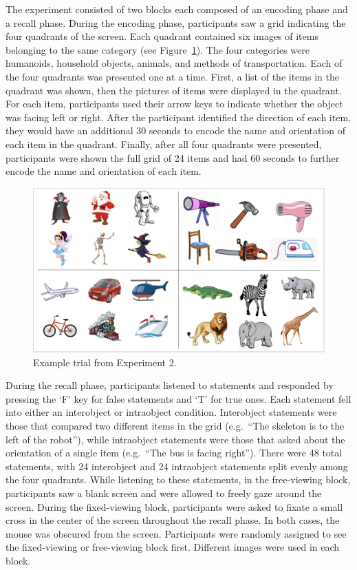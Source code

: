 \documentclass[
  man,floatsintext]{apa6}
\begin{document}
The experiment consisted of two blocks each composed of an encoding
phase and a recall phase. During the encoding phase, participants saw a
grid indicating the four quadrants of the screen. Each quadrant
contained six images of items belonging to the same category (see Figure~\ref{fig:E2-example-trial}).
The four categories were humanoids, household objects, animals, and
methods of transportation.
Each of the four quadrants was presented one at a time. First, a list of
the items in the quadrant was shown, then the pictures of items were displayed in the quadrant.
For each item, participants used their arrow keys to indicate whether the object was facing left or right. After the participant identified the direction of each
item, they would have an additional 30 seconds to encode the name and
orientation of each item in the quadrant. Finally, after all four quadrants
were presented, participants were shown the full grid of
24 items and had 60 seconds to further encode the name and orientation
of each item.

\begin{figure}
\includegraphics[width=5.47in]{group-b/E2-example-figure} \caption{Example trial from Experiment 2.}\label{fig:E2-example-trial}
\end{figure}

During the recall phase, participants listened to statements and
responded by pressing the `F' key for false statements and `T' for true
ones. Each statement fell into either an interobject or intraobject
condition. Interobject statements were those that compared two different
items in the grid (e.g.~``The skeleton is to the left of the robot''),
while intraobject statements were those that asked about the orientation
of a single item (e.g.~``The bus is facing right''). There were 48 total
statements, with 24 interobject and 24 intraobject statements split
evenly among the four quadrants. While listening to these statements, in
the free-viewing block, participants saw a blank screen and were allowed
to freely gaze around the screen. During the fixed-viewing block,
participants were asked to fixate a small cross in the center of the
screen throughout the recall phase. In both cases, the mouse was
obscured from the screen. Participants were randomly assigned to see the
fixed-viewing or free-viewing block first. Different images were used in each block.
\end{document}
